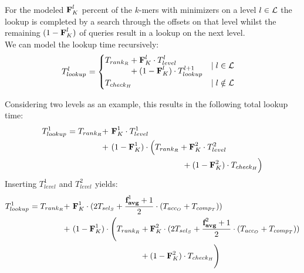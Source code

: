 \documentclass[a4paper,titlepage,onecolumn,oneside,12pt,nenglish,titlepage=firstiscover]{scrbook}
\theoremstyle{plain} %
\theoremstyle{definition} %
\theoremstyle{remark} %
\theoremstyle{plain}
\newcommand{\level}{l}
\newcommand{\access}{acc}
\newcommand{\contains}{rank}
\newcommand{\select}{sel}
\newcommand{\compare}{comp}
\newcommand{\timeForOperationOnStructure}[2]{T_{#1_{#2}}} %
\newcommand{\varAverageFrequency}{\textbf{f}_{\textbf{avg}}}
\begin{document}
For the modeled $\varCDF{K}^\level$ percent of the $k$-mers with \infrequent minimizers on a level $l \in \mathcal{L}$ the lookup is completed by a search through the offsets on that level whilst the remaining $(1-\varCDF{K}^\level)$ of queries result in a lookup on the next level.\\
We can model the lookup time recursively:
\begin{align}
	\timeForOperationOnStructure{lookup}{}^{l} &= 
	\begin{cases}
	\begin{aligned}
		\timeForOperationOnStructure{\contains}{R} &+ \varCDF{K}^\level \cdot \timeForOperationOnStructure{level}{}^\level\\
		&+ (1-\varCDF{K}^\level) \cdot \timeForOperationOnStructure{lookup}{}^{l+1}
	\end{aligned} &\mid l \in \setOfLevels\\
	\timeForOperationOnStructure{check}{H} &\mid l \notin \setOfLevels
\end{cases}
\end{align}

Considering two levels as an example, this results in the following total lookup time:
\begin{align}
	\timeForOperationOnStructure{lookup}{}^1 = \timeForOperationOnStructure{\contains}{R} +&~ \varCDF{K}^1 \cdot \timeForOperationOnStructure{level}{}^1\\
		+&~ (1-\varCDF{K}^1) \cdot \Big( \timeForOperationOnStructure{\contains}{R} + \varCDF{K}^2 \cdot \timeForOperationOnStructure{level}{}^2\\
		&~ \phantom{(1-\varCDF{K}^1) \cdot \Big( \timeForOperationOnStructure{\contains}{R^2}} + (1-\varCDF{K}^2) \cdot \timeForOperationOnStructure{check}{H} \Big)\\
\end{align}
Inserting $\timeForOperationOnStructure{level}{}^1$ and $\timeForOperationOnStructure{level}{}^2$ yields:
\begin{align}
	\timeForOperationOnStructure{lookup}{}^1 =
		\timeForOperationOnStructure{\contains}{R} +&~ \varCDF{K}^1 \cdot (2\timeForOperationOnStructure{\select}{S} + \frac{\varAverageFrequency^1+1}{2}  \cdot (\timeForOperationOnStructure{\access}{O} + \timeForOperationOnStructure{\compare}{T}))\\
			+&~ (1-\varCDF{K}^1) \cdot \Bigg(\timeForOperationOnStructure{\contains}{R} + \varCDF{K}^2 \cdot (2\timeForOperationOnStructure{\select}{S} + \frac{\varAverageFrequency^2+1}{2}  \cdot (\timeForOperationOnStructure{\access}{O} + \timeForOperationOnStructure{\compare}{T}))\\
			&~\phantom{(1-\varCDF{K}^1) \cdot \Bigg(\timeForOperationOnStructure{\contains}{R}} + (1-\varCDF{K}^2) \cdot \timeForOperationOnStructure{check}{H} \Bigg)
\end{align}
\end{document}
